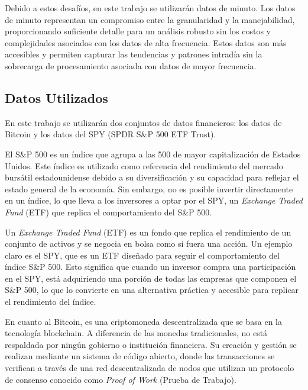 \documentclass[a4paper,12pt, twoside]{report}
\begin{document}
Debido a estos desafíos, en este trabajo se utilizarán datos de minuto. Los datos de minuto representan un compromiso entre la 
granularidad y la manejabilidad, proporcionando suficiente detalle para un análisis robusto sin los costos y complejidades asociados 
con los datos de alta frecuencia. Estos datos son más accesibles y permiten capturar las tendencias y patrones intradía sin la 
sobrecarga de procesamiento asociada con datos de mayor frecuencia.



\subsection{Datos Utilizados}


En este trabajo se utilizarán dos conjuntos de datos financieros: los datos de Bitcoin y los 
datos del SPY (SPDR S\&P 500 ETF Trust).

El S\&P 500 es un índice que agrupa a las 500 de mayor capitalización 
de Estados Unidos. Este índice es utilizado como referencia del rendimiento 
del mercado bursátil estadounidense debido a su diversificación y su capacidad 
para reflejar el estado general de la economía. Sin embargo, no es posible invertir 
directamente en un índice, lo que lleva a los inversores a optar por el SPY, 
un \textit{Exchange Traded Fund} (ETF) que replica el comportamiento del 
S\&P 500.

Un \textit{Exchange Traded Fund} (ETF) es un fondo que replica el rendimiento de un 
conjunto de activos y se negocia en bolsa como si fuera una acción. Un ejemplo claro 
es el SPY, que es un ETF diseñado para seguir el comportamiento del índice S\&P 500. 
Esto significa que cuando un inversor compra una participación en el SPY, está 
adquiriendo una porción de todas las empresas que componen el S\&P 500, lo que lo 
convierte en una alternativa práctica y accesible para replicar el rendimiento 
del índice.

En cuanto al Bitcoin, es una criptomoneda descentralizada que se basa en la tecnología 
blockchain. A diferencia de las monedas tradicionales, no está respaldada por ningún 
gobierno o institución financiera. Su creación y gestión se realizan mediante un 
sistema de código abierto, donde las transacciones se verifican a través de una red 
descentralizada de nodos que utilizan un protocolo de consenso conocido como 
\textit{Proof of Work} (Prueba de Trabajo).
\end{document}
